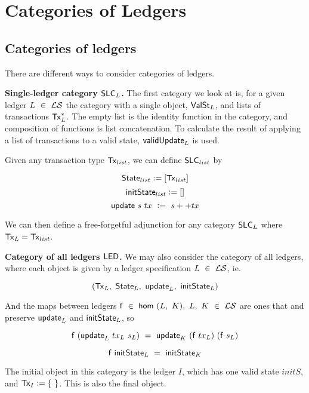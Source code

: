 \section{Categories of Ledgers}
\label{sec:cats}

\subsection{Categories of ledgers}

There are different ways to consider categories of ledgers.

\textbf{Single-ledger category $\mathsf{SLC}_L$.} The first category we look at
is, for a given ledger $L~\in~\mathcal{L}\mathcal{S}$ the category with a single object,
$\mathsf{ValSt}_L$, and lists of transactions $\mathsf{Tx}_L^{*}$.
The empty list is the identity function in the category, and composition of
functions is list concatenation. To calculate the result of applying
a list of transactions to a valid state, $\mathsf{validUpdate}_L$ is used.

Given any transaction type $\mathsf{Tx}_{list}$, we can define $\mathsf{SLC}_{list}$ by

\[ \mathsf{State}_{list} \mathrel{\mathop:}= [\mathsf{Tx}_{list}] \]
\[ \mathsf{initState}_{list} \mathrel{\mathop:}= [] \]
\[ \mathsf{update}~s~tx~\mathrel{\mathop:}=~s++tx \]

We can then define a free-forgetful adjunction for any category $\mathsf{SLC}_L$ where
$\mathsf{Tx}_L = \mathsf{Tx}_{list}$.


\textbf{Category of all ledgers $\mathsf{LED}$.} We may also consider the category of all
ledgers, where each object is given by a ledger specification $L~\in~\mathcal{L}\mathcal{S}$, ie.

\[ (\mathsf{Tx}_L,~\mathsf{State}_L,~\mathsf{update}_L,~\mathsf{initState}_L) \]

And the maps between ledgers $\mathsf{f}~\in~\mathsf{hom}~(L,~K),~L,~K~\in~\mathcal{L}\mathcal{S}$ are ones that
and preserve $\mathsf{update}_L$ and $\mathsf{initState}_L$, so

\[ \mathsf{f}~(\mathsf{update}_L~tx_L~s_L)~=~\mathsf{update}_K~(\mathsf{f}~tx_L)~(\mathsf{f}~s_L) \]

\[ \mathsf{f}~\mathsf{initState}_L~=~\mathsf{initState}_K \]

The initial object in this category is the ledger $I$, which has one valid state $initS$,
and $\mathsf{Tx}_I \mathrel{\mathop:}= \{~\}$. This is also the final object.

